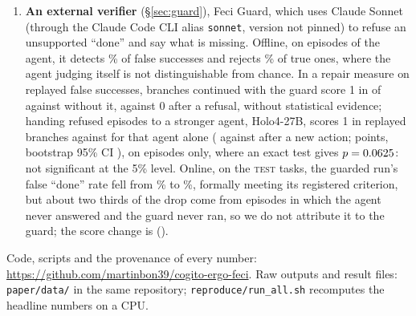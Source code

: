 \begin{enumerate}
\item \textbf{An external verifier} (\S\ref{sec:guard}), Feci Guard, which uses Claude Sonnet (through the Claude Code CLI alias \texttt{sonnet}, version not pinned) to refuse an unsupported ``done'' and say what is missing. Offline, on \gbEpisodes{} episodes of the agent, it detects \gbClaudeDet\% of false successes and rejects \gbClaudeRej\% of true ones, where the agent judging itself is not distinguishable from chance. In a repair measure on replayed false successes, branches continued with the guard score 1 in \fgRepRepairedGuard{} of \fgRepBranches{} against \fgRepRepairedNog{} without it, \fgRepSpecific{} against 0 after a refusal, without statistical evidence; handing refused episodes to a stronger agent, Holo4-27B, scores 1 in \rbGuardSucc{} replayed branches against \rbCtrlSucc{} for that agent alone (\rbGuardAfterAction{} against \rbCtrlAfterAction{} after a new action; \rbPrimDiff{} points, bootstrap 95\% CI \rbPrimDiffCi), on \rbPrimEpisodes{} episodes only, where an exact test gives $p=0.0625$: not significant at the 5\% level. Online, on the \OgN{} \textsc{test} tasks, the guarded run's false ``done'' rate fell from \OgFdBase\% to \OgFdGuard\%, formally meeting its registered criterion, but about two thirds of the drop come from episodes in which the agent never answered and the guard never ran, so we do not attribute it to the guard; the score change is \OgScoreDiff{} (\OgScoreDiffCi).
\end{enumerate}
Code, scripts and the provenance of every number: \url{https://github.com/martinbon39/cogito-ergo-feci}. Raw outputs and result files: \texttt{paper/data/} in the same repository; \texttt{reproduce/run\_all.sh} recomputes the headline numbers on a CPU.

